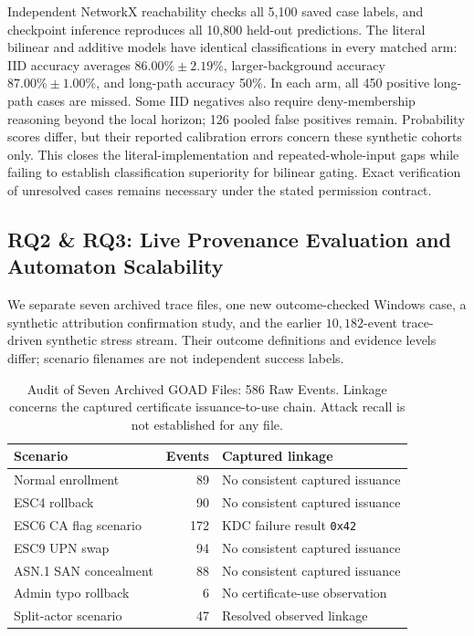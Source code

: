 

Independent NetworkX reachability checks all 5,100 saved case labels, and checkpoint inference reproduces all 10,800 held-out predictions. The literal bilinear and additive models have identical classifications in every matched arm: IID accuracy averages $86.00\%\pm2.19\%$, larger-background accuracy $87.00\%\pm1.00\%$, and long-path accuracy 50\%. In each arm, all 450 positive long-path cases are missed. Some IID negatives also require deny-membership reasoning beyond the local horizon; 126 pooled false positives remain. Probability scores differ, but their reported calibration errors concern these synthetic cohorts only. This closes the literal-implementation and repeated-whole-input gaps while failing to establish classification superiority for bilinear gating. Exact verification of unresolved cases remains necessary under the stated permission contract.

\subsection{RQ2 \& RQ3: Live Provenance Evaluation and Automaton Scalability}
We separate seven archived trace files, one new outcome-checked Windows case, a synthetic attribution confirmation study, and the earlier $10,182$-event trace-driven synthetic stress stream. Their outcome definitions and evidence levels differ; scenario filenames are not independent success labels.

\begin{table}[tbp]
\centering
\caption{Audit of Seven Archived GOAD Files: 586 Raw Events. Linkage concerns the captured certificate issuance-to-use chain. Attack recall is not established for any file.}
\label{tab:live_traces}
\evidencetable
\setlength{\tabcolsep}{2pt}
\begin{tabular}{@{}>{\raggedright\arraybackslash}p{.32\linewidth}r>{\raggedright\arraybackslash}p{.51\linewidth}@{}}
\toprule
Scenario & Events & Captured linkage \\
\midrule
Normal enrollment & 89 & No consistent captured issuance \\
ESC4 rollback & 90 & No consistent captured issuance \\
ESC6 CA flag scenario & 172 & KDC failure result \texttt{0x42} \\
ESC9 UPN swap & 94 & No consistent captured issuance \\
ASN.1 SAN concealment & 88 & No consistent captured issuance \\
Admin typo rollback & 6 & No certificate-use observation \\
Split-actor scenario & 47 & Resolved observed linkage \\
\bottomrule
\end{tabular}
\end{table}

